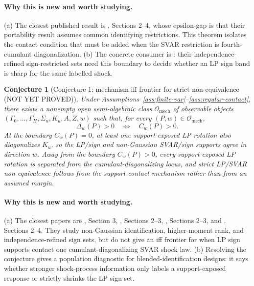 \documentclass[11pt]{article}
\theoremstyle{definition}
\theoremstyle{plain}
\newtheorem{conjecture}{Conjecture}
\theoremstyle{remark}
\begin{document}
\paragraph{Why this is new and worth studying.}
(a) The closest published result is \citet{PlagborgMollerWolf2021}, Sections 2--4, whose epsilon-gap is that their portability result assumes common identifying restrictions.  This theorem isolates the contact condition that must be added when the SVAR restriction is fourth-cumulant diagonalization.  (b) The concrete consumer is \citet{DrautzburgWright2023}: their independence-refined sign-restricted sets need this boundary to decide whether an LP sign band is sharp for the same labelled shock.

\begin{conjecture}[Conjecture 1: mechanism iff frontier for strict non-equivalence (NOT YET PROVED)]\label{conj:mechanism-iff}
Under Assumptions~\ref{ass:finite-var}--\ref{ass:regular-contact}, there exists a nonempty open semi-algebraic class \(\mathcal O_{\mathrm{mech}}\) of observable objects \((\Gamma_0,\ldots,\Gamma_H,\Sigma_u,K_u,A,Z,w)\) such that, for every \((P,w)\in\mathcal O_{\mathrm{mech}}\),
\[
\Delta_w(P)>0 \quad\Longleftrightarrow\quad C_w(P)>0.
\]
At the boundary \(C_w(P)=0\), at least one support-exposed LP rotation also diagonalizes \(K_u\), so the LP/sign and non-Gaussian SVAR/sign supports agree in direction \(w\).  Away from the boundary \(C_w(P)>0\), every support-exposed LP rotation is separated from the cumulant-diagonalizing locus, and strict LP/SVAR non-equivalence follows from the support-contact mechanism rather than from an assumed margin.
\end{conjecture}
\paragraph{Why this is new and worth studying.}
(a) The closest papers are \citet{GourierouxMonfortRenne2017}, Section 3, \citet{LanneMeitzSaikkonen2017}, Sections 2--3, \citet{Guay2021}, Sections 2--3, and \citet{DrautzburgWright2023}, Sections 2--4.  They study non-Gaussian identification, higher-moment rank, and independence-refined sign sets, but do not give an iff frontier for when LP sign supports contact one cumulant-diagonalizing SVAR shock law.  (b) Resolving the conjecture gives \citet{CarrieroMarcellinoTornese2024} a population diagnostic for blended-identification designs: it says whether stronger shock-process information only labels a support-exposed response or strictly shrinks the LP sign set.
\end{document}
